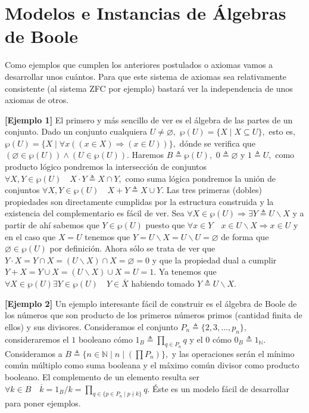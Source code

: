 \chapter{Modelos e Instancias de Álgebras de Boole}

  Como ejemplos que cumplen los anteriores postulados o axiomas vamos a
  desarrollar unos cuántos. Para que este sistema de axiomas sea
  relativamente consistente (al sistema ZFC por ejemplo) bastará ver la
  independencia de unos axiomas de otros.

  \textbf{{[}Ejemplo 1{]}} El primero y más sencillo de ver es el
  álgebra de las partes de un conjunto. Dado un conjunto
  cualquiera $U \neq \varnothing,$
  $\wp(U) = \{X \mid X \subseteq U\},$ esto es,
  $\wp(U) = \{X \mid \forall x ( (x \in X) \Rightarrow (x \in U) ) \},$
  dónde se verifica
  que $(\varnothing \in \wp(U)) \land (U \in \wp(U)).$
  Haremos $B \triangleq \wp(U),$ $0 \triangleq \varnothing$ y $1 \triangleq U,$
  como producto lógico pondremos la intersección de
  conjuntos $\forall X, Y \in \wp(U) \quad X \cdot Y \triangleq X \cap Y,$ como
  suma lógica pondremos la unión de
  conjuntos $\forall X, Y \in \wp(U) \quad X + Y \triangleq X \cup Y.$ Las tres
  primeras (dobles) propiedades son directamente cumplidas por la
  estructura construida y la existencia del complementario es fácil de
  ver. Sea
  $\forall X \in \wp(U) \Rightarrow \exists Y \triangleq U \smallsetminus X$ y a
  partir de ahí sabemos que $Y \in \wp(U)$ puesto
  que $\forall x \in Y \quad x \in U \smallsetminus X \Rightarrow x \in U$ y
  en el caso que $X = U$ tenemos que
  $Y = U \smallsetminus X = U \smallsetminus U = \varnothing$ de
  forma que $\varnothing \in \wp(U)$ por definición. Ahora sólo se trata
  de ver
  que $Y \cdot X = Y \cap X = (U \smallsetminus X) \cap X = \varnothing = 0$ y
  que la propiedad dual a
  cumplir $Y + X = Y \cup X = (U \smallsetminus X) \cup X = U = 1.$
  Ya tenemos
  que $\forall X \in \wp(U) \exists Y \in \wp(U) \quad Y \in \overline{X}$ habiendo
  tomado $Y \triangleq U \smallsetminus X.$

  \textbf{{[}Ejemplo 2{]}} Un ejemplo interesante fácil de construir es
  el álgebra de Boole de los números que son producto de los primeros
  números primos (cantidad finita de ellos) y sus divisores.
  Consideramos el conjunto $P_{n} \triangleq \{2,3,\ldots,p_{n}\},$
  consideraremos el $1$ booleano cómo
  $1_{B} \triangleq \prod\limits_{q \in P_{n}}q$ y el $0$
  cómo $0_{B} \triangleq 1_{\mathbb{N}}.$ Consideramos a
  $B \triangleq \{n \in \mathbb{N} \mid n \mid ( \prod P_{n} ) \},$
  y las operaciones serán el mínimo común múltiplo como suma booleana y
  el máximo común divisor como producto booleano. El complemento de un
  elemento resulta ser
  $\forall k \in B \quad \overline{k} = 1_{B}/k = \prod\limits_{q \in \{p \in P_{n} \mid p \nmid k\}}q.$
  Éste es un modelo fácil de desarrollar para poner ejemplos.

